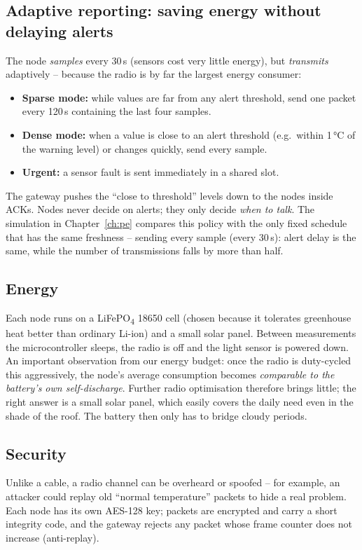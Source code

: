 \documentclass[11pt,a4paper]{report}
\begin{document}
\subsection{Adaptive reporting: saving energy without delaying alerts}\label{sec:adaptive}
The node \emph{samples} every 30\,s (sensors cost very little energy), but \emph{transmits} adaptively -- because the radio is by far the largest energy consumer:
\begin{itemize}
  \item \textbf{Sparse mode:} while values are far from any alert threshold, send one packet every 120\,s containing the last four samples.
  \item \textbf{Dense mode:} when a value is close to an alert threshold (e.g.\ within 1\,°C of the warning level) or changes quickly, send every sample.
  \item \textbf{Urgent:} a sensor fault is sent immediately in a shared slot.
\end{itemize}
The gateway pushes the ``close to threshold'' levels down to the nodes inside ACKs. Nodes never decide on alerts; they only decide \emph{when to talk}. The simulation in Chapter~\ref{ch:pe} compares this policy with the only fixed schedule that has the same freshness -- sending every sample (every 30\,s): alert delay is the same, while the number of transmissions falls by more than half.

\subsection{Energy}
Each node runs on a LiFePO\textsubscript{4} 18650 cell (chosen because it tolerates greenhouse heat better than ordinary Li-ion) and a small solar panel. Between measurements the microcontroller sleeps, the radio is off and the light sensor is powered down. An important observation from our energy budget: once the radio is duty-cycled this aggressively, the node's average consumption becomes \emph{comparable to the battery's own self-discharge}. Further radio optimisation therefore brings little; the right answer is a small solar panel, which easily covers the daily need even in the shade of the roof. The battery then only has to bridge cloudy periods.

\subsection{Security}
Unlike a cable, a radio channel can be overheard or spoofed -- for example, an attacker could replay old ``normal temperature'' packets to hide a real problem. Each node has its own AES-128 key; packets are encrypted and carry a short integrity code, and the gateway rejects any packet whose frame counter does not increase (anti-replay).
\end{document}
